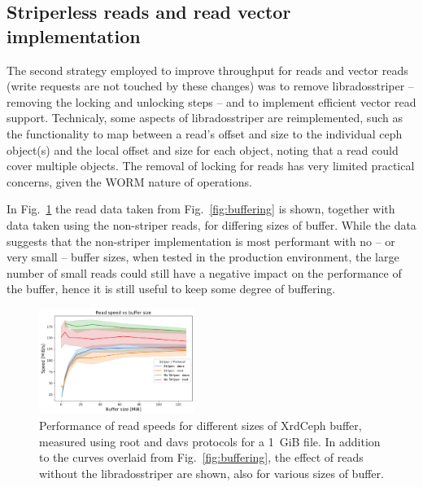 \documentclass{webofc}
\begin{document}
\subsection{Striperless reads and read vector implementation\label{sec:striperless}}
The second strategy employed to improve throughput for reads and vector reads (write requests are not touched by these changes) was to remove libradosstriper -- removing the locking and unlocking steps -- and to implement efficient vector read support. 
Technicaly, some aspects of libradosstriper are reimplemented, such as the functionality to map between a read's offset and size to the individual ceph object(s) and the local offset and size for each object, noting that a read could cover multiple objects. The removal of locking for reads has very limited practical concerns, given the WORM nature of operations.

In Fig.~\ref{fig:bufferingnostriper} the read data taken from Fig.~\ref{fig:buffering} is shown, together with data taken using the non-striper reads, for differing sizes of buffer. While the data suggests that the non-striper implementation is most performant with no -- or very small -- buffer sizes, when tested in the production environment, the large number of small reads could still have a negative impact on the performance of the buffer, hence it is still useful to keep some degree of buffering. 
%
\begin{figure}[h]
     \centering
     \includegraphics[width=0.45\textwidth,clip]{figures/fig_read_speed_comined.png}\hfil
     \caption{Performance of read speeds for different sizes of XrdCeph buffer, measured using root and davs protocols for a 1~GiB file. In addition to the curves overlaid from Fig.~\ref{fig:buffering}, the effect of reads without the libradosstriper are shown, also for various sizes of buffer.}
     \label{fig:bufferingnostriper}       %
\end{figure}
\end{document}
